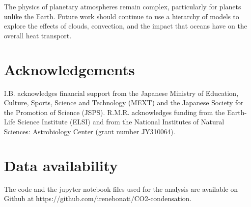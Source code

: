 \documentclass[fleqn,usenatbib]{mnras}
\begin{document}
The physics of planetary atmospheres remain complex, particularly for planets unlike the Earth. Future work should continue to use a hierarchy of models to explore the effects of clouds, convection, and the impact that oceans have on the overall heat transport. 

\section*{Acknowledgements}
I.B. acknowledges financial support from the Japanese Ministry of Education, Culture, Sports, Science and Technology (MEXT) and the Japanese Society for the Promotion of Science (JSPS).
R.M.R. acknowledges funding from the Earth-Life Science Institute (ELSI) and from the National Institutes of Natural Sciences: Astrobiology Center (grant number JY310064).

\section*{Data availability}
The code and the jupyter notebook files used for the analysis are available on Github at https://github.com/irenebonati/CO2-condensation.













\bsp	%
\label{lastpage}
\end{document}
